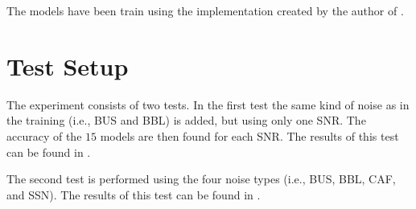 The models have been train using the implementation created by the author of \cite{bovbjerg2023improving}. 

\section{Test Setup}
The experiment consists of two tests. In the first test the same kind of noise as in the training (i.e., BUS and BBL) is added, but using only one SNR. The accuracy of the \(15\) models are then found for each SNR. The results of this test can be found in .

The second test is performed using the four noise types (i.e., BUS, BBL, CAF, and SSN). The results of this test can be found in .



